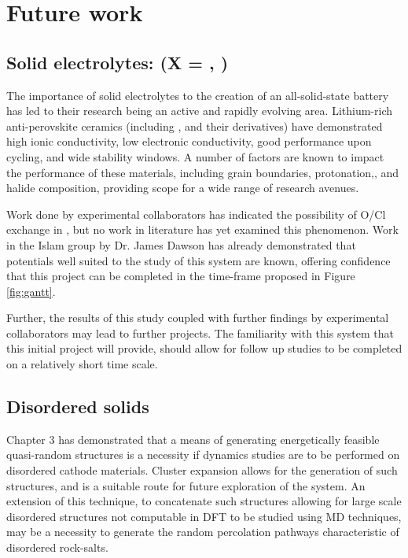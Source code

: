\chapter{Future work} %

\section{Solid electrolytes:  (X = , )}
The importance of solid electrolytes to the creation of an all-solid-state battery has led to their research being an active and rapidly evolving area.
Lithium-rich anti-perovskite ceramics (including ,  and their derivatives)\cite{Zhao2012} have demonstrated high ionic conductivity, low electronic conductivity, good performance upon cycling, and wide stability windows.
A number of factors are known to impact the performance of these materials, including grain boundaries,\cite{Dawson2018} protonation,\cite{Dawson2018a}, and halide composition,\cite{Dawson2018b} providing scope for a wide range of research avenues.

Work done by experimental collaborators has indicated the possibility of O/Cl exchange in , but no work in literature has yet examined this phenomenon.
Work in the Islam group by Dr. James Dawson has already demonstrated that potentials well suited to the study of this system are known, offering confidence that this project can be completed in the time-frame proposed in Figure \ref{fig:gantt}.

Further, the results of this study coupled with further findings by experimental collaborators may lead to further projects.
The familiarity with this system that this initial project will provide, should allow for follow up studies to be completed on a relatively short time scale.

\section{Disordered solids}
Chapter 3 has demonstrated that a means of generating energetically feasible quasi-random structures is a necessity if dynamics studies are to be performed on disordered cathode materials.
Cluster expansion\cite{Chang2019} allows for the generation of such structures, and is a suitable route for future exploration of the system.
An extension of this technique, to concatenate such structures allowing for large scale disordered structures not computable in DFT to be studied using MD techniques, may be a necessity to generate the random percolation pathways characteristic of disordered rock-salts.

